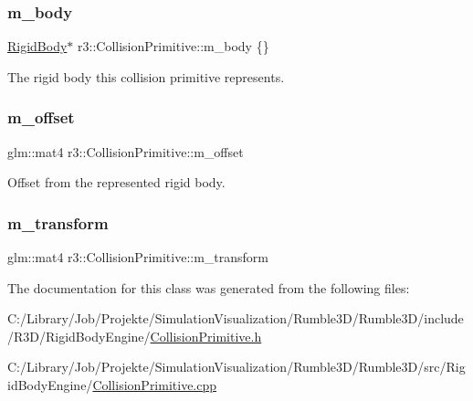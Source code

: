 \subsubsection{\texorpdfstring{m\+\_\+body}{m\_body}}
{\footnotesize\ttfamily \mbox{\hyperlink{classr3_1_1_rigid_body}{Rigid\+Body}}$\ast$ r3\+::\+Collision\+Primitive\+::m\+\_\+body \{\}\hspace{0.3cm}{\ttfamily [protected]}}



The rigid body this collision primitive represents. 

\mbox{\label{classr3_1_1_collision_primitive_a15a51c2e72a8c5122a1031d6620a2901}} 
\subsubsection{\texorpdfstring{m\+\_\+offset}{m\_offset}}
{\footnotesize\ttfamily glm\+::mat4 r3\+::\+Collision\+Primitive\+::m\+\_\+offset\hspace{0.3cm}{\ttfamily [protected]}}



Offset from the represented rigid body. 

\mbox{\label{classr3_1_1_collision_primitive_a0cb28517e7791b9836a5cac5d8550b13}} 
\subsubsection{\texorpdfstring{m\+\_\+transform}{m\_transform}}
{\footnotesize\ttfamily glm\+::mat4 r3\+::\+Collision\+Primitive\+::m\+\_\+transform\hspace{0.3cm}{\ttfamily [protected]}}



The documentation for this class was generated from the following files\+:\begin{DoxyCompactItemize}
\item 
C\+:/\+Library/\+Job/\+Projekte/\+Simulation\+Visualization/\+Rumble3\+D/\+Rumble3\+D/include/\+R3\+D/\+Rigid\+Body\+Engine/\mbox{\hyperlink{_collision_primitive_8h}{Collision\+Primitive.\+h}}\item 
C\+:/\+Library/\+Job/\+Projekte/\+Simulation\+Visualization/\+Rumble3\+D/\+Rumble3\+D/src/\+Rigid\+Body\+Engine/\mbox{\hyperlink{_collision_primitive_8cpp}{Collision\+Primitive.\+cpp}}\end{DoxyCompactItemize}

